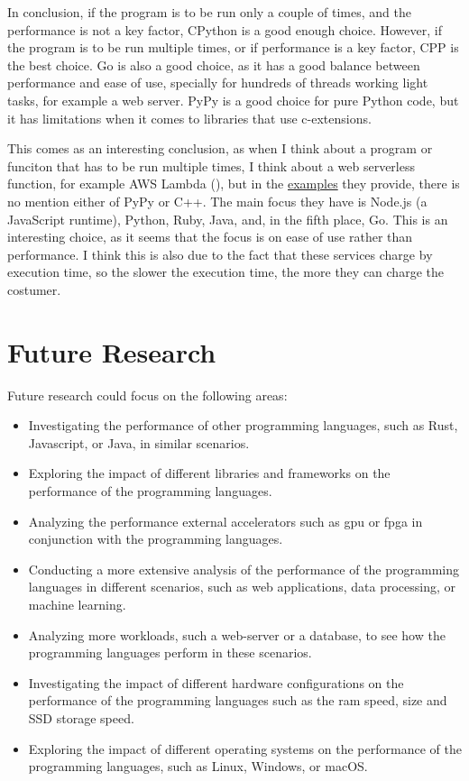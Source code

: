 In conclusion, if the program is to be run only a couple of times, and the performance is not a key factor, \gls{CPython} is a good enough choice. However, if the program is to be run multiple times, or if performance is a key factor, \gls{CPP} is the best choice. Go is also a good choice, as it has a good balance between performance and ease of use, specially for hundreds of threads working light tasks, for example a web server. PyPy is a good choice for pure Python code, but it has limitations when it comes to libraries that use \glspl{c-extension}.

This comes as an interesting conclusion, as when I think about a program or funciton that has to be run multiple times, I think about a web serverless function, for example AWS Lambda (\cite{aws:lambda}), but in the \href{https://docs.aws.amazon.com/lambda/latest/dg/lambda-samples.html}{examples} they provide, there is no mention either of PyPy or C++. The main focus they have is Node.js (a JavaScript runtime), Python, Ruby, Java, and, in the fifth place, Go. This is an interesting choice, as it seems that the focus is on ease of use rather than performance. I think this is also due to the fact that these services charge by execution time, so the slower the execution time, the more they can charge the costumer. 


\section{Future Research}
Future research could focus on the following areas:
\begin{itemize}
    \item Investigating the performance of other programming languages, such as Rust, Javascript, or Java, in similar scenarios.
    \item Exploring the impact of different libraries and frameworks on the performance of the programming languages.
    \item Analyzing the performance external accelerators such as \gls{gpu} or \gls{fpga} in conjunction with the programming languages.
    \item Conducting a more extensive analysis of the performance of the programming languages in different scenarios, such as web applications, data processing, or machine learning.
    \item Analyzing more workloads, such a web-server or a database, to see how the programming languages perform in these scenarios.
    \item Investigating the impact of different hardware configurations on the performance of the programming languages such as the \gls{ram} speed, size and SSD storage speed.
    \item Exploring the impact of different operating systems on the performance of the programming languages, such as Linux, Windows, or macOS.
\end{itemize}